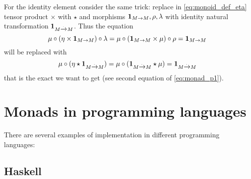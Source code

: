 For the identity element consider the same trick: replace in
\eqref{eq:monoid_def_eta} tensor
product $\times$ with  $\star$ and
morphisms $\mathbf{1}_{ M \to M }, \rho, \lambda$ with identity natural transformation
$\mathbf{1}_{ M \xrightarrow{.} M }$. Thus the equation
\[
\mu \circ (\eta \times \mathbf{1}_{ M \to M })
\circ \lambda = \mu \circ (\mathbf{1}_{ M \to M } \times \mu) \circ \rho =
\mathbf{1}_{ M \to M }
\]
will be replaced with
\[
\mu \circ (\eta \star \mathbf{1}_{ M \xrightarrow{.} M }) = \mu \circ (\mathbf{1}_{ M \xrightarrow{.} M } \star \mu) =
\mathbf{1}_{ M \xrightarrow{.} M }
\]
that is the exact we want to get (see second equation of
\eqref{eq:monad_p1}). 


\section{Monads in programming languages}
There are several examples of  implementation in
different programming languages:

\subsection{Haskell}

